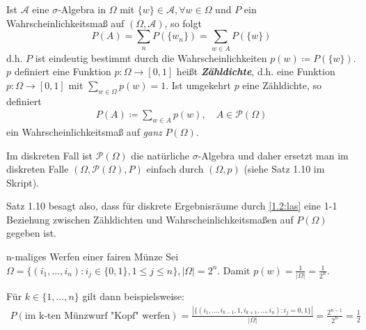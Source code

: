 \documentclass[a4paper, landscape,twocolumn,fontsize=9pt]{scrartcl}
\newcommand{\vip}[1]{\textit{\textbf{#1}}}
\begin{document}
Ist $\mathcal A$ eine $\sigma$-Algebra in $\Omega$  mit $\{ w \} \in \mathcal A, \forall w \in \Omega$ und $P$ ein Wahrscheinlichkeitsmaß auf $(\Omega, \mathcal A)$, so folgt
\[
	P(A) = \sum_n P(\{ w_n \}) = \sum_{w \in A} P(\{ w \})
\]
d.h. $P$ ist eindeutig bestimmt durch die Wahrscheinlichkeiten $p(w) \coloneqq P(\{ w \})$. $p$ definiert eine Funktion $p: \Omega \to [0,1]$ heißt \vip{Zähldichte}, d.h. eine Funktion $p: \Omega \to [0,1]$ mit $\sum_{w \in \Omega} p(w) = 1$. Ist umgekehrt $p$ eine Zähldichte, so definiert
\begin{align}\label{1.2:las}
	P(A) \coloneqq \sum_{w \in A}p(w), \quad A \in \mathcal P(\Omega)
\end{align}
ein Wahrscheinlichkeitsmaß auf \emph{ganz} $P(\Omega).$

\begin{important}{}{}
Im diskreten Fall ist $\mathcal P(\Omega)$ die natürliche $\sigma$-Algebra und daher ersetzt man im diskreten Falle $(\Omega, \mathcal P(\Omega), P)$ einfach durch $(\Omega, p)$ (siehe Satz 1.10 im Skript).
\end{important}

Satz 1.10 besagt also, dass für diskrete Ergebnisräume durch \eqref{1.2:las} eine 1-1 Beziehung zwischen Zähldichten und Wahrscheinlichkeitsmaßen auf $P(\Omega)$ gegeben ist.

\begin{example}{n-maliges Werfen einer fairen Münze}{}
Sei $\Omega = \{ (i_1,...,i_n) : i_j \in \{ 0,1 \}, 1 \leq j \leq n \}, |\Omega| = 2^n$. Damit $p(w) = \frac{1}{|\Omega|} = \frac{1}{2^n}$.

Für $k \in \{ 1,..., n \}$ gilt dann beispielsweise:
\begin{align*}
P(\text{im k-ten Münzwurf "Kopf" werfen}) = \frac{|\{ (i_1,...,i_{k-1}, 1 , i_{k+1}, ..., i_n) : i_j = 0,1 \}|}{|\Omega|} = \frac{2^{n-1}}{2^n} = \frac{1}{2}
\end{align*}
\end{example}
\end{document}
